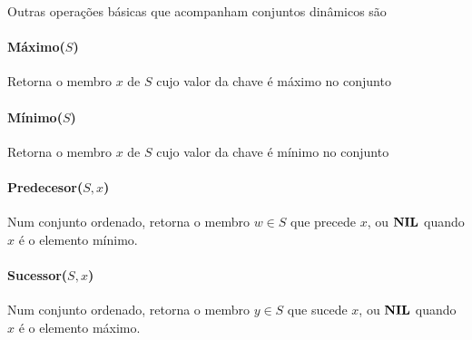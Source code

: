 Outras operações básicas que acompanham conjuntos dinâmicos são

\paragraph{Máximo($S$)} Retorna o membro $x$ de $S$ cujo valor da chave é máximo no
conjunto

\paragraph{Mínimo($S$)} Retorna o membro $x$ de $S$ cujo valor da chave é mínimo no
conjunto

\paragraph{Predecesor($S, x$)} Num conjunto ordenado, retorna o membro $w \in S$ que
precede $x$, ou $\mathbf{NIL}$ quando $x$ é o elemento mínimo.

\paragraph{Sucessor($S, x$)} Num conjunto ordenado, retorna o membro $y \in S$ que
sucede $x$, ou $\mathbf{NIL}$ quando $x$ é o elemento máximo.
